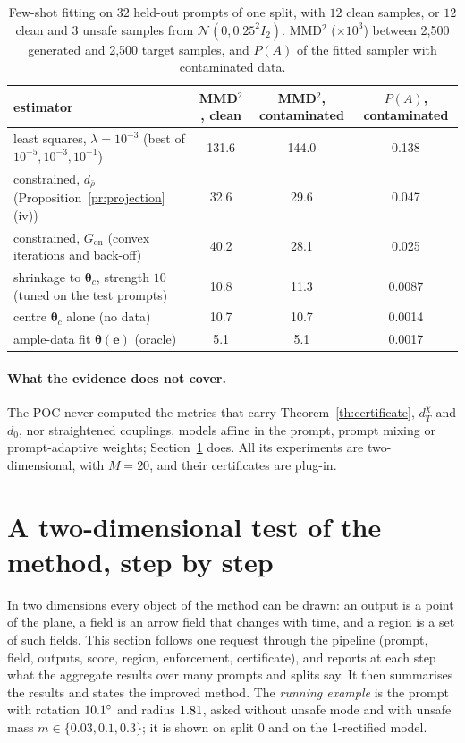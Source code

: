 \documentclass{article}
\newcommand{\cN}{\mathcal{N}}
\newcommand{\bth}{\boldsymbol{\theta}}
\newcommand{\be}{\mathbf{e}}
\theoremstyle{plain}
\theoremstyle{remark}
\begin{document}
\begin{table}[t]
\centering
\caption{Few-shot fitting on $32$ held-out prompts of one split, with $12$ clean samples, or $12$
clean and $3$ unsafe samples from $\cN(0,0.25^2I_2)$. MMD$^2$ ($\times10^3$) between 2,500 generated and
2,500 target samples, and $P(A)$ of the fitted sampler with contaminated data.}
\label{tab:fewshot}
\small
\begin{tabular}{l c c c}
\toprule
estimator & MMD$^2$, clean & MMD$^2$, contaminated & $P(A)$, contaminated\\
\midrule
least squares, $\lambda=10^{-3}$ (best of $10^{-5},10^{-3},10^{-1}$) & 131.6 & 144.0 & 0.138\\
constrained, $d_{\bar\rho}$ (Proposition~\ref{pr:projection}(iv)) & 32.6 & 29.6 & 0.047\\
constrained, $G_{\mathrm{on}}$ (convex iterations and back-off) & 40.2 & 28.1 & 0.025\\
shrinkage to $\bth_c$, strength $10$ (tuned on the test prompts) & 10.8 & 11.3 & 0.0087\\
centre $\bth_c$ alone (no data) & 10.7 & 10.7 & 0.0014\\
ample-data fit $\bth(\be)$ (oracle) & 5.1 & 5.1 & 0.0017\\
\bottomrule
\end{tabular}
\end{table}

\paragraph{What the evidence does not cover.}
The POC never computed the metrics that carry Theorem~\ref{th:certificate}, $d^\chi_T$ and $d_0$, nor straightened
couplings, models affine in the prompt, prompt mixing or prompt-adaptive weights; Section~\ref{sec:e1} does.
All its experiments are two-dimensional, with $M=20$, and their certificates are plug-in.

\section{A two-dimensional test of the method, step by step}\label{sec:e1}

In two dimensions every object of the method can be drawn: an output is a point of the plane, a field is an arrow
field that changes with time, and a region is a set of such fields. This section follows one request through the
pipeline (prompt, field, outputs, score, region, enforcement, certificate), and reports at each step what the
aggregate results over many prompts and splits say. It then summarises the results and states the improved method.
The \emph{running example} is the prompt with rotation $10.1^\circ$ and radius $1.81$, asked without unsafe mode and with
unsafe mass $m\in\{0.03,0.1,0.3\}$; it is shown on split $0$ and on the 1-rectified model.
\end{document}

